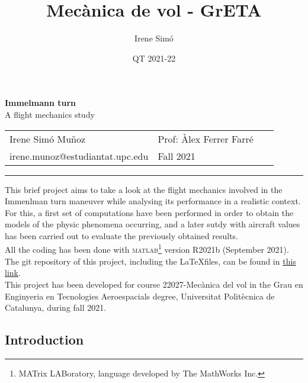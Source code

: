 \documentclass[10pt, twoside]{report}
\title{Mecànica de vol - GrETA}
\author{Irene Simó}
\date{QT 2021-22}
\begin{document}
\thispagestyle{empty} 
	\begin{center}
	\LARGE \textbf{Immelmann turn}\\
	\Large A flight mechanics study\\
		\normalsize \vspace{0.5cm}
	\begin{tabular}{p{0.45\linewidth} p{0.45\linewidth}}
		Irene Simó Muñoz & Prof: Àlex Ferrer Farré\\
		irene.munoz@estudiantat.upc.edu & Fall 2021
	\end{tabular}

	\hrule
	\end{center}
	This brief project aims to take a look at the flight mechanics involved in the Immenlman turn maneuver while analysing its performance in a realistic context. \\ For this, a first set of computations have been performed in order to obtain the models of the physic phenomena occurring, and a later sutdy with aircraft values has been carried out to evaluate the previously obtained results.\\
	All the coding has been done with \textsc{matlab}\footnote{MATrix LABoratory, language developed by The MathWorks Inc.} version R2021b (September 2021). The git repository of this project, including the \LaTeX files, can be found in \hyperlink{https://github.com/isimo00/immelmann-turn}{this link}.\\
	This project has been developed for course 22027-Mecànica del vol in the Grau en Enginyeria en Tecnologies Aeroespacials degree, Universitat Politècnica de Catalunya, during fall 2021.
	
	\begin{multicols}{2}
	\vspace*{-2cm}
	\tableofcontents
	\section*{Introduction}
	
		
	

	\end{multicols}\clearpage

\listoffigures
\clearpage
\appendix

\end{document}
